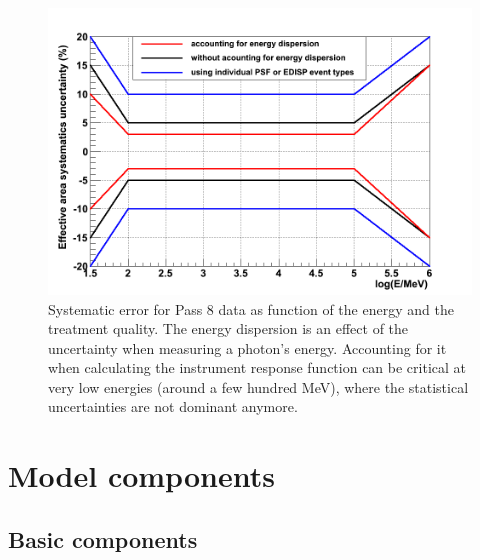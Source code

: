 \begin{figure}[h]
 \centering
 \includegraphics[width=.5\linewidth]{pic/method/LAT_sys_error.png}
 \caption{Systematic error for Pass 8 data as function of the energy and the treatment quality. The energy dispersion is an effect of the uncertainty when measuring a photon's energy. Accounting for it when calculating the instrument response function can be critical at very low energies (around a few hundred MeV), where the statistical uncertainties are not dominant anymore.}
 \label{fig:LAT_sys_err}
\end{figure}


\section{Model components}
\subsection{Basic components}

